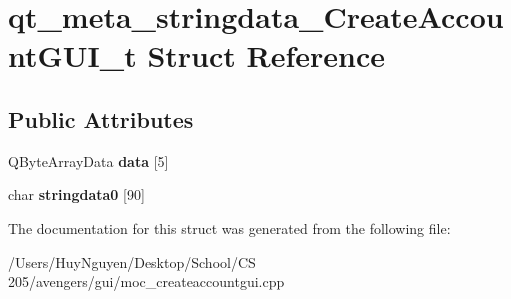 \hypertarget{structqt__meta__stringdata__CreateAccountGUI__t}{}\section{qt\+\_\+meta\+\_\+stringdata\+\_\+\+Create\+Account\+G\+U\+I\+\_\+t Struct Reference}
\label{structqt__meta__stringdata__CreateAccountGUI__t}
\subsection*{Public Attributes}
\begin{DoxyCompactItemize}
\item 
Q\+Byte\+Array\+Data {\bfseries data} \mbox{[}5\mbox{]}\hypertarget{structqt__meta__stringdata__CreateAccountGUI__t_ac25ee1d430cd4f52e354adbb8cbd7b2e}{}\label{structqt__meta__stringdata__CreateAccountGUI__t_ac25ee1d430cd4f52e354adbb8cbd7b2e}

\item 
char {\bfseries stringdata0} \mbox{[}90\mbox{]}\hypertarget{structqt__meta__stringdata__CreateAccountGUI__t_add26ddf62bc288fbf31b9d786769838c}{}\label{structqt__meta__stringdata__CreateAccountGUI__t_add26ddf62bc288fbf31b9d786769838c}

\end{DoxyCompactItemize}


The documentation for this struct was generated from the following file\+:\begin{DoxyCompactItemize}
\item 
/\+Users/\+Huy\+Nguyen/\+Desktop/\+School/\+C\+S 205/avengers/gui/moc\+\_\+createaccountgui.\+cpp\end{DoxyCompactItemize}
